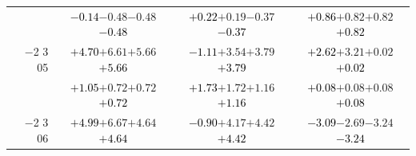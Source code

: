 \documentclass[compress]{beamer}
\begin{document}
\begin{frame}
\begin{tabular}{r | c | c | c}
          & \textcolor{black}{$-0.14$}\hspace{0.1 cm}$-0.48$\hspace{0.1 cm}$-0.48$\hspace{0.1 cm}\textcolor{black}{$-0.48$} & \textcolor{black}{$+0.22$}\hspace{0.1 cm}$+0.19$\hspace{0.1 cm}$-0.37$\hspace{0.1 cm}\textcolor{black}{$-0.37$} & \textcolor{black}{$+0.86$}\hspace{0.1 cm}$+0.82$\hspace{0.1 cm}$+0.82$\hspace{0.1 cm}\textcolor{black}{$+0.82$} \\
$-$2 3 05 & \textcolor{black}{$+4.70$}\hspace{0.1 cm}$+6.61$\hspace{0.1 cm}$+5.66$\hspace{0.1 cm}\textcolor{black}{$+5.66$} & \textcolor{black}{$-1.11$}\hspace{0.1 cm}$+3.54$\hspace{0.1 cm}$+3.79$\hspace{0.1 cm}\textcolor{black}{$+3.79$} & \textcolor{black}{$+2.62$}\hspace{0.1 cm}$+3.21$\hspace{0.1 cm}$+0.02$\hspace{0.1 cm}\textcolor{black}{$+0.02$} \\
          & \textcolor{black}{$+1.05$}\hspace{0.1 cm}$+0.72$\hspace{0.1 cm}$+0.72$\hspace{0.1 cm}\textcolor{black}{$+0.72$} & \textcolor{black}{$+1.73$}\hspace{0.1 cm}$+1.72$\hspace{0.1 cm}$+1.16$\hspace{0.1 cm}\textcolor{black}{$+1.16$} & \textcolor{black}{$+0.08$}\hspace{0.1 cm}$+0.08$\hspace{0.1 cm}$+0.08$\hspace{0.1 cm}\textcolor{black}{$+0.08$} \\
$-$2 3 06 & \textcolor{black}{$+4.99$}\hspace{0.1 cm}$+6.67$\hspace{0.1 cm}$+4.64$\hspace{0.1 cm}\textcolor{black}{$+4.64$} & \textcolor{black}{$-0.90$}\hspace{0.1 cm}$+4.17$\hspace{0.1 cm}$+4.42$\hspace{0.1 cm}\textcolor{black}{$+4.42$} & \textcolor{black}{$-3.09$}\hspace{0.1 cm}$-2.69$\hspace{0.1 cm}$-3.24$\hspace{0.1 cm}\textcolor{black}{$-3.24$} \\

\end{tabular}
\end{frame}
\end{document}
